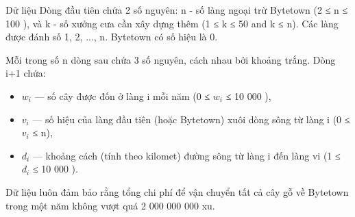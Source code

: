 Dữ liệu  
Dòng đầu tiên chứa 2 số nguyên: n - số làng ngoại trừ Bytetown (2 ≤ n ≤ 100 ), và k - số xưởng cưa cần xây dựng thêm (1 ≤ k ≤ 50 and k ≤ n). Các làng được đánh số 1, 2, ..., n. Bytetown có số hiệu là 0.  

   Mỗi trong số n dòng sau chứa 3 số nguyên, cách nhau bởi khoảng trắng. Dòng i+1 chứa:  
\begin{itemize}
	\item     $w_{i}$    — số cây được đốn ở làng i mỗi năm (0 ≤ $w_{i}$    ≤ 10 000 ),   
	\item     $v_{i}$    — số hiệu của làng đầu tiên (hoặc Bytetown) xuôi dòng sông từ làng i (0 ≤ $v_{i}$    ≤ n),   
	\item     $d_{i}$    — khoảng cách (tính theo kilomet) đường sông từ làng i đến làng vi (1 ≤ $d_{i}$    ≤ 10 000 ).   
\end{itemize}

   Dữ liệu luôn đảm bảo rằng tổng chi phí để vận chuyển tất cả cây gỗ về Bytetown trong một năm không vượt quá 2 000 000 000 xu.